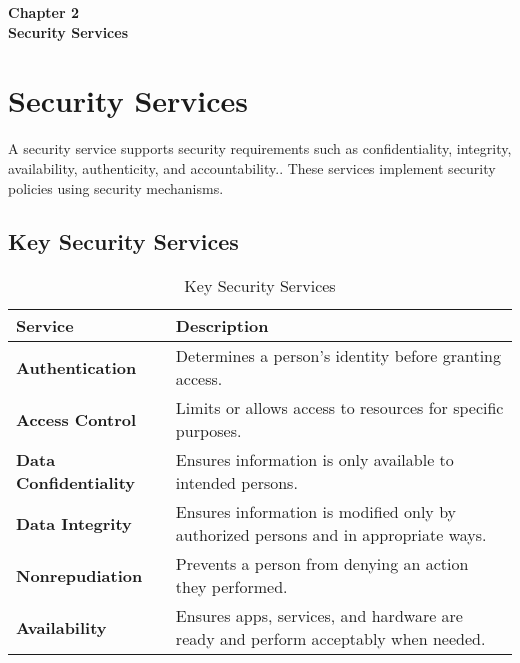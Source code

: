 \clearpage
\thispagestyle{empty} 
\begin{center}
    \vspace*{\fill} 
    \Huge \textbf{Chapter 2} \\
    \Huge \textbf{Security Services} 
    \vspace*{\fill}
\end{center}
\clearpage

\chapter{Security Services}

A security service supports security requirements such as confidentiality, integrity, availability, authenticity, and accountability.\label{SecurityService}. These services implement security policies using security mechanisms.\label{SecurityMechanism}

\section{Key Security Services}
\begin{table}[h!]
    \centering
    \caption{Key Security Services}
    \vspace{0.4cm}
\begin{tabular}{|p{3.5cm}|p{9cm}|}
    \hline
    \textbf{Service} & \textbf{Description} \\ \hline
    \textbf{Authentication} & Determines a person’s identity before granting access.\index{Authentication}\label{Authentication} \\ \hline
    \textbf{Access Control} & Limits or allows access to resources for specific purposes.\index{Access Control}\label{AccessControl} \\ \hline
    \textbf{Data Confidentiality} & Ensures information is only available to intended persons.\index{Data Confidentiality}\label{DataConfidentiality} \\ \hline
    \textbf{Data Integrity} & Ensures information is modified only by authorized persons and in appropriate ways.\index{Data Integrity}\label{DataIntegrity} \\ \hline
    \textbf{Nonrepudiation} & Prevents a person from denying an action they performed.\index{Nonrepudiation}\label{Nonrepudiation} \\ \hline
    \textbf{Availability} & Ensures apps, services, and hardware are ready and perform acceptably when needed.\index{Availability}\label{Availability} \\ \hline
\end{tabular}
\end{table}

